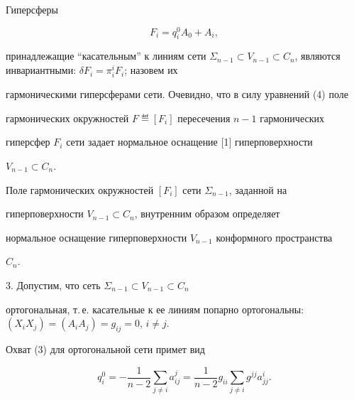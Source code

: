  


Гиперсферы 


\begin{equation} 


F_i=q^0_iA_0+A_i, 


\end{equation} 


принадлежащие ``касательным'' к линиям сети $\Sigma_{n-1}\subset V_{n-1} 


\subset C_n$, являются инвариантными: $\delta F_i=\pi^i_i F_i$; назовем их 


гармоническими гиперсферами сети. Очевидно, что в силу уравнений (4) поле 


гармонических окружностей $F\eqdef [F_i]$ пересечения $n-1$ гармонических 


гиперсфер $F_i$ сети задает нормальное оснащение [1] гиперповерхности 


$V_{n-1}\subset C_n$. 


 


 


\begin{thm} 


Поле гармонических окружностей $[F_i]$ сети $\Sigma_{n-1}$, заданной на 


гиперповерхности $V_{n-1}\subset C_n$, внутренним образом определяет 


нормальное оснащение гиперповерхности $V_{n-1}$ конформного пространства 


$C_n$. 


\end{thm} 


 


3. Допустим, что сеть $\Sigma_{n-1}\subset V_{n-1}\subset C_n$ 


ортогональная, т.\,е. касательные к ее линиям попарно ортогональны: $(X_i 


X_j)=(A_i A_j)=g_{ij}=0$, $i\ne j$. 


 


Охват (3) для ортогональной сети примет вид 


\begin{equation} 


q^0_i=-\frac{1}{n-2}\sum_{j\ne i}a^j_{ij}=\frac{1}{n-2}g_{ii} 


\sum_{j\ne i}g^{jj}a^i_{jj}. 


\end{equation} 


